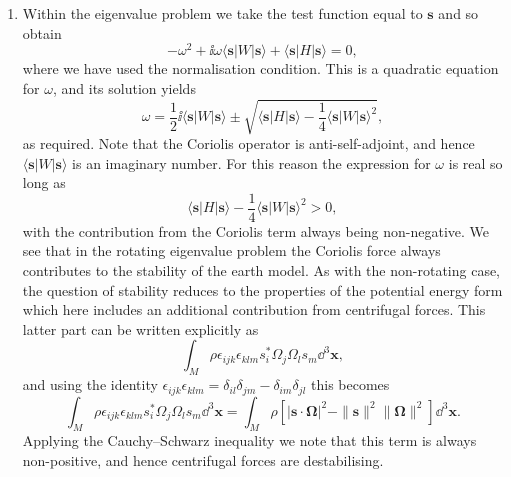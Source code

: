 \documentclass[a4paper,10pt]{paper}
\begin{document}
\begin{enumerate}
\item Within the eigenvalue problem we take the test function equal to $\mathbf{s}$ and so obtain
\begin{equation*}
    -\omega^{2}+\ii\omega\langle \mathbf{s}|W|\mathbf{s}\rangle+\langle \mathbf{s}|H|\mathbf{s}\rangle=0,
\end{equation*}
where we have used the normalisation condition. This is a quadratic equation for $\omega$, and its solution yields
\begin{equation*}
    \omega=\frac{1}{2}\ii\langle \mathbf{s}|W|\mathbf{s}\rangle\pm\sqrt{\langle \mathbf{s}|H|\mathbf{s}\rangle-\frac{1}{4}\langle \mathbf{s}|W|\mathbf{s}\rangle^{2}},
\end{equation*}
as required. Note that the Coriolis operator is anti-self-adjoint, and hence $\langle \mathbf{s}|W|\mathbf{s}\rangle$ is an imaginary number. For this reason the expression for $\omega$ is real so long as
\begin{equation*}
    \langle \mathbf{s}|H|\mathbf{s}\rangle-\frac{1}{4}\langle \mathbf{s}|W|\mathbf{s}\rangle^{2}>0,
\end{equation*}
with the contribution from the Coriolis term always being non-negative. We see that in the rotating eigenvalue problem the Coriolis force always contributes to the stability of the earth model. As with the non-rotating case, the question of stability reduces to the properties of the potential energy form which here includes an additional contribution from centrifugal forces. This latter part can be written explicitly as
\begin{equation*}
    \int_{M}\rho\epsilon_{ijk}\epsilon_{klm}s_{i}^{*}\Omega_{j}\Omega_{l}s_{m}\dd^{3}\mathbf{x},
\end{equation*}
and using the identity $\epsilon_{ijk}\epsilon_{klm}=\delta_{il}\delta_{jm}-\delta_{im}\delta_{jl}$ this becomes
\begin{equation*}
    \int_{M}\rho\epsilon_{ijk}\epsilon_{klm}s_{i}^{*}\Omega_{j}\Omega_{l}s_{m}\dd^{3}\mathbf{x}=\int_{M}\rho[|\mathbf{s}\cdot\bm{\Omega}|^{2}-\|\mathbf{s}\|^{2}\|\bm{\Omega}\|^{2}]\dd^{3}\mathbf{x}.
\end{equation*}
Applying the Cauchy--Schwarz inequality we note that this term is always non-positive, and hence centrifugal forces are destabilising.


\end{enumerate}
\end{document}
